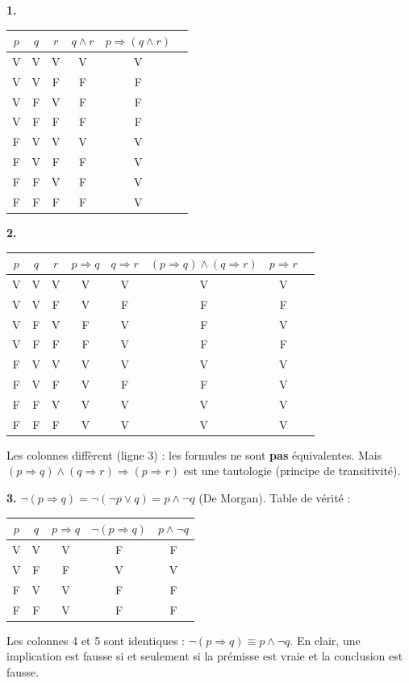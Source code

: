 \documentclass[12pt,a4paper]{article}
\begin{document}
\begin{boitecorrige}
\textbf{1.}
\begin{center}
\begin{tabular}{ccc|cc|c}
$p$ & $q$ & $r$ & $q\wedge r$ & $p\Rightarrow(q\wedge r)$\\
\hline
V & V & V & V & V\\
V & V & F & F & F\\
V & F & V & F & F\\
V & F & F & F & F\\
F & V & V & V & V\\
F & V & F & F & V\\
F & F & V & F & V\\
F & F & F & F & V\\
\end{tabular}
\end{center}

\textbf{2.}
\begin{center}
\begin{tabular}{ccc|cc|cc|c}
$p$ & $q$ & $r$ & $p\Rightarrow q$ & $q\Rightarrow r$ & $(p\Rightarrow q)\wedge(q\Rightarrow r)$ & $p\Rightarrow r$\\
\hline
V & V & V & V & V & V & V\\
V & V & F & V & F & F & F\\
V & F & V & F & V & F & V\\
V & F & F & F & V & F & F\\
F & V & V & V & V & V & V\\
F & V & F & V & F & F & V\\
F & F & V & V & V & V & V\\
F & F & F & V & V & V & V\\
\end{tabular}
\end{center}
Les colonnes diffèrent (ligne 3) : les formules ne sont \textbf{pas} équivalentes. Mais $(p\Rightarrow q)\wedge(q\Rightarrow r)\Rightarrow(p\Rightarrow r)$ est une tautologie (principe de transitivité).

\textbf{3.} $\neg(p\Rightarrow q) = \neg(\neg p\vee q) = p\wedge\neg q$ (De Morgan). Table de vérité :
\begin{center}
\begin{tabular}{cc|c|c|c}
$p$ & $q$ & $p\Rightarrow q$ & $\neg(p\Rightarrow q)$ & $p\wedge\neg q$\\
\hline
V & V & V & F & F\\
V & F & F & V & V\\
F & V & V & F & F\\
F & F & V & F & F\\
\end{tabular}
\end{center}
Les colonnes 4 et 5 sont identiques : $\neg(p\Rightarrow q)\equiv p\wedge\neg q$. En clair, une implication est fausse si et seulement si la prémisse est vraie et la conclusion est fausse.
\end{boitecorrige}
\end{document}
